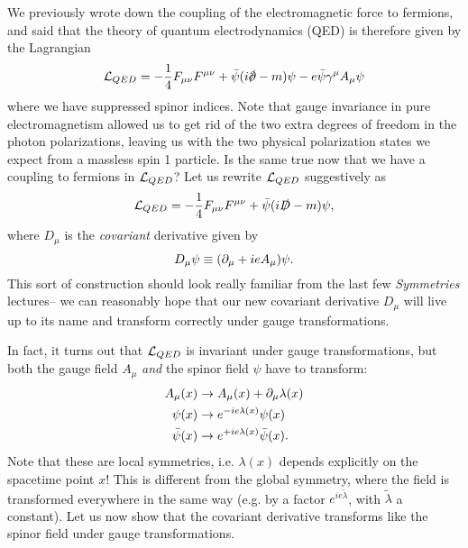We previously wrote down the coupling of the electromagnetic force to fermions, and said that the theory of quantum electrodynamics (QED) is therefore given by the Lagrangian
\begin{equation}
    \cL_{QED}=-\frac{1}{4} F_{\mu\nu} F^{\mu\nu}+\bar \psi (i\slashed{\p}-m)\psi -e \bar \psi \gamma^\mu A_\mu \psi
\end{equation}
where we have suppressed spinor indices. Note that gauge invariance in pure electromagnetism allowed us to get rid of the two extra degrees of freedom in the photon polarizations, leaving us with the two physical polarization states we expect from a massless spin 1 particle. Is the same true now that we have a coupling to fermions in $\mathcal L_{QED}$? Let us rewrite $\mathcal L_{QED}$ suggestively as
\begin{equation}
    \mathcal L_{QED}=-\frac{1}{4} F_{\mu\nu} F^{\mu\nu}+\bar \psi (i\slashed{D}-m)\psi,
\end{equation}
where $D_\mu$ is the \emph{covariant} derivative given by
\begin{equation}
    D_\mu \psi \equiv (\partial_\mu+ie A_\mu)\psi.
\end{equation}
This sort of construction should look really familiar from the last few \emph{Symmetries} lectures-- we can reasonably hope that our new covariant derivative $D_\mu$ will live up to its name and transform correctly under gauge transformations.

In fact, it turns out that $\mathcal L_{QED}$ is invariant under gauge transformations, but both the gauge field $A_\mu$ \emph{and} the spinor field $\psi$ have to transform:
\begin{subequations}
    \begin{align}
        A_\mu(x) &\to A_\mu(x)+\partial_\mu \lambda(x)\\
        \psi(x) &\to e^{-ie \lambda(x)}\psi(x)\\
        \bar\psi(x) &\to e^{+ie \lambda(x)}\bar\psi(x).
    \end{align}
\end{subequations}
Note that these are local symmetries, i.e. $\lambda(x)$ depends explicitly on the spacetime point $x$! This is different from the global symmetry, where the field is transformed everywhere in the same way (e.g. by a factor $e^{ie\tilde \lambda}$, with $\tilde \lambda$ a constant). Let us now show that the covariant derivative transforms like the spinor field under gauge transformations.


